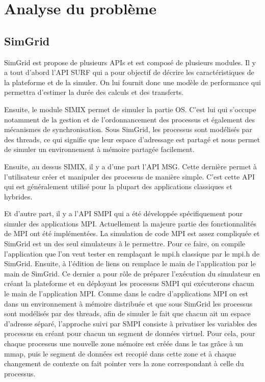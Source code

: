 \documentclass[smallextended]{svjour3}
\begin{document}
\section{Analyse du problème}
\label{sec-3}
\subsection{SimGrid}
\label{sec-3-1}
SimGrid est propose de plusieurs APIs et est composé de plusieurs
modules. Il y a tout d'abord l'API SURF qui a pour objectif de
décrire les caractéristiques de la plateforme et de la simuler. On
lui fournit donc une modèle de performance qui permettra d'estimer
la durée des calculs et des transferts.

Ensuite, le module SIMIX permet de simuler la partie OS. C'est lui
qui s'occupe notamment de la gestion et de l'ordonnancement des
processus et également des mécanismes de synchronisation. Sous
SimGrid, les processus sont modélisés par des threads, ce qui
signifie que leur espace d'adressage est partagé et nous permet
de simuler un environnement à mémoire partagée facilement. 

Ensuite, au dessus SIMIX, il y a d'une part l'API MSG. Cette dernière
permet à l'utilisateur créer et manipuler des processus de manière
simple. C'est cette API qui est généralement utilisé pour la
plupart des applications classiques et hybrides. 

Et d'autre part, il y a l'API SMPI qui a été développée
spécifiquement pour simuler des applications MPI. Actuellement la
majeure partie des fonctionnalités de MPI ont été implémentées. La
simulation de code MPI est assez compliquée et SimGrid est un des
seul simulateurs à le permettre. Pour ce faire, on compile
l'application que l'on veut tester en remplaçant le mpi.h classique
par le mpi.h de SimGrid. Ensuite, à l'édition de liens on remplace
le main de l'application par le main de SimGrid. Ce dernier a pour
rôle de préparer l'exécution du simulateur en créant la plateforme
et en déployant les processus SMPI qui exécuterons chacun le main
de l'application MPI. Comme dans le cadre d'applications MPI on est
dans un environnement à mémoire distribuée et que sous SimGrid les
processus sont modélisés par des threads, afin de simuler le fait
que chacun ait un espace d'adresse séparé, l'approche suivi par SMPI
consiste à privatiser les variables des processus en créant pour
chacun un segment de données virtuel. Pour cela, pour chaque processus
une nouvelle zone mémoire est créée dans le tas grâce à un mmap, puis le
segment de données est recopié dans cette zone et à chaque
changement de contexte on fait pointer vers la zone correspondant à
celle du processus. 
\end{document}

